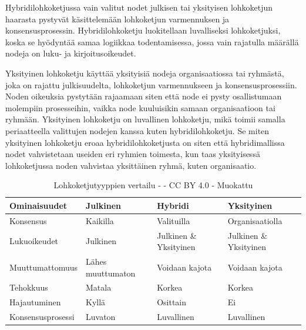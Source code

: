 \documentclass[utf8,bachelor]{gradu3}
\begin{document}
Hybridilohkoketjussa vain valitut nodet julkisen tai yksityisen lohkoketjun haarasta pystyvät käsittelemään lohkoketjun varmennuksen ja konsensusprosessin. Hybridilohkoketju luokitellaan luvalliseksi lohkoketjuksi, koska se hyödyntää samaa logiikkaa todentamisessa, jossa vain rajatulla määrällä nodeja on luku- ja kirjoitusoikeudet.

Yksityinen lohkoketju käyttää yksityisiä nodeja organisaatiossa tai ryhmästä, joka on rajattu julkisuudelta, lohkoketjun varmennukseen ja konsensusprosessiin. Noden oikeuksia pystytään rajaamaan siten että node ei pysty osallistumaan molempiin prosesseihin, vaikka node kuuluisikin samaan organisaatioon tai ryhmään.  Yksityinen lohkoketju on luvallinen lohkoketju, mikä toimii samalla periaatteella valittujen nodejen kanssa kuten hybridilohkoketju. Se miten yksityinen lohkoketju eroaa hybridilohkoketjusta on siten että hybridimallissa nodet vahvistetaan useiden eri ryhmien toimesta, kun taas yksityisessä lohkoketjussa noden vahvistaa yksittäinen ryhmä, kuten organisaatio.

\begin{table}[ht]\centering
  \begin{tabular}{llll}
    \toprule
    Ominaisuudet & Julkinen & Hybridi & Yksityinen \\
    \midrule
    Konsensus & Kaikilla & Valituilla & Organisaatiolla \\
    Lukuoikeudet & Julkinen & Julkinen \& Yksityinen & Julkinen \& Yksityinen \\
    Muuttumattomuus & Lähes muuttumaton & Voidaan kajota & Voidaan kajota \\
    Tehokkuus & Matala & Korkea & Korkea \\
    Hajautuminen & Kyllä & Osittain & Ei \\
    Konsensusprosessi & Luvaton & Luvallinen & Luvallinen \\
    \bottomrule
  \end{tabular}
  \caption{Lohkoketjutyyppien vertailu - \cite{zarrin2021blockchain} - CC BY 4.0 - Muokattu}
  \label{tbl:cmdchange}
\end{table}
\end{document}
